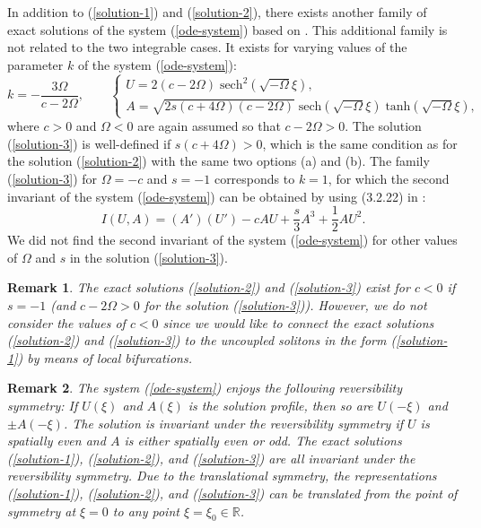 \documentclass[12pt,reqno]{amsart}
\numberwithin{equation}{section}
\newtheorem{remark}{Remark}
\begin{document}
In addition to (\ref{solution-1}) and (\ref{solution-2}), there exists another family of exact solutions of the system (\ref{ode-system}) based on \cite{Anco}. 
This additional family is not related to the two integrable cases. It exists for varying values of the parameter $k$ of the system (\ref{ode-system}):
	\begin{equation}
	\label{solution-3}
	k = -\frac{3 \Omega}{c-2\Omega}, \qquad 
	\begin{cases}
	U = 2 (c-2 \Omega) \; \text{sech}^2(\sqrt{-\Omega} \xi), \\
	A=\sqrt{2 s (c+4\Omega)(c - 2 \Omega)} \; \text{sech}(\sqrt{-\Omega} \xi) \; \text{tanh}(\sqrt{-\Omega} \xi),
	\end{cases}
	\end{equation}
	where $c > 0$ and $\Omega < 0$ are again assumed so that $c - 2 \Omega > 0$. The solution (\ref{solution-3}) is well-defined if $s (c + 4 \Omega) > 0$, which is the same condition as for the solution (\ref{solution-2}) with the same two options (a) and (b). The family (\ref{solution-3}) for $\Omega = -c$ and $s = -1$ corresponds to $k = 1$, for which the second invariant of the  system (\ref{ode-system}) can be obtained by using (3.2.22) in \cite{Hietarinta}:
	\begin{equation}
	\label{second-invariant-another}
	I(U,A) =  (A') (U') - c A U + \frac{s}{3} A^3 + \frac{1}{2} A U^2.
	\end{equation}
We did not find the second invariant of the system (\ref{ode-system}) for 
other values of $\Omega$ and $s$ in the solution (\ref{solution-3}).

\begin{remark}
	The exact solutions (\ref{solution-2}) and (\ref{solution-3}) exist for $c < 0$ if $s = -1$ (and $c - 2 \Omega > 0$ for the solution (\ref{solution-3})). However, we do not consider the values of $c < 0$ since we would like to connect the exact solutions (\ref{solution-2}) and (\ref{solution-3}) to the uncoupled solitons in the form (\ref{solution-1}) by means of local bifurcations.
\end{remark}

\begin{remark}
	\label{rem-reversibility}
	The system (\ref{ode-system}) enjoys the following reversibility symmetry: If $U(\xi)$ and $A(\xi)$ is the solution profile, then so are $U(-\xi)$ and $\pm A(-\xi)$. The solution is invariant under the reversibility symmetry if $U$ is spatially even and 
	$A$ is either spatially even or odd. The exact solutions (\ref{solution-1}), (\ref{solution-2}), and (\ref{solution-3}) are all invariant under the reversibility symmetry. Due to the translational symmetry, the representations (\ref{solution-1}), (\ref{solution-2}), and (\ref{solution-3}) can be translated from the point of symmetry at $\xi = 0$ to any point $\xi = \xi_0 \in \mathbb{R}$. 
\end{remark}
\end{document}
